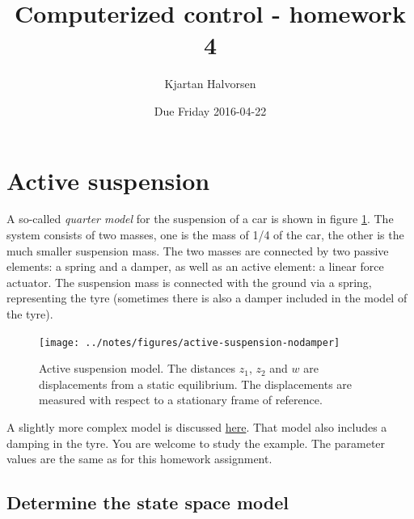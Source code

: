 \documentclass{scrartcl}
\author{Kjartan Halvorsen}
\date{Due Friday 2016-04-22}
\title{Computerized control - homework 4}
\begin{document}
\maketitle

\section*{Active suspension}
\label{sec:orgheadline5}
A so-called \emph{quarter model} for the suspension of a car is shown in figure \ref{fig:quarter}. The system consists of two masses, one is the mass of 1/4 of the car, the other is the much smaller suspension mass. The two masses are connected by two passive elements: a spring and a damper, as well as an active element: a linear force actuator. The suspension mass is connected with the ground via a spring, representing the tyre (sometimes there is also a damper included in the model of the tyre).
\begin{figure}
\begin{center}
\texttt{[image: ../notes/figures/active-suspension-nodamper]}
\caption{Active suspension model. The distances $z_1$, $z_2$ and $w$ are displacements from a static equilibrium. The displacements are measured with respect to a stationary frame of reference.}
\label{fig:quarter}
\end{center}
\end{figure}

A slightly more complex model is discussed \href{http://ctms.engin.umich.edu/CTMS/index.php?example=Suspension&section=ControlStateSpace}{here}. That model also includes a damping in the tyre. You are welcome to study the example. The parameter values are the same as for this homework assignment.

\subsection*{Determine the state space model}
\label{sec:orgheadline1}
\end{document}
